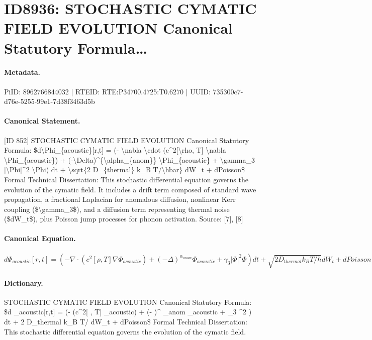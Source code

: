 \section*{ID8936: STOCHASTIC CYMATIC FIELD EVOLUTION Canonical Statutory Formula…}
\paragraph{Metadata.}
PiID: 8962766844032 | RTEID: RTE:P34700.4725:T0.6270 | UUID: 735300c7-d76e-5255-99e1-7d38f3463d5b

\paragraph{Canonical Statement.}
[ID 852] STOCHASTIC CYMATIC FIELD EVOLUTION Canonical Statutory Formula: \$d\textbackslash{}Phi\_\{acoustic\}[r,t] = (- \textbackslash{}nabla \textbackslash{}cdot (c\textasciicircum{}2[\textbackslash{}rho, T] \textbackslash{}nabla \textbackslash{}Phi\_\{acoustic\}) + (-\textbackslash{}Delta)\textasciicircum{}\{\textbackslash{}alpha\_\{anom\}\} \textbackslash{}Phi\_\{acoustic\} + \textbackslash{}gamma\_3 |\textbackslash{}Phi|\textasciicircum{}2 \textbackslash{}Phi) dt + \textbackslash{}sqrt\{2 D\_\{thermal\} k\_B T/\textbackslash{}hbar\} dW\_t + dPoisson\$ Formal Technical Dissertation: This stochastic differential equation governs the evolution of the cymatic field. It includes a drift term composed of standard wave propagation, a fractional Laplacian for anomalous diffusion, nonlinear Kerr coupling (\$\textbackslash{}gamma\_3\$), and a diffusion term representing thermal noise (\$dW\_t\$), plus Poisson jump processes for phonon activation. Source: [7], [8]

\paragraph{Canonical Equation.}
\[
d\Phi_{acoustic}[r,t] = (- \nabla \cdot (c^2[\rho, T] \nabla \Phi_{acoustic}) + (-\Delta)^{\alpha_{anom}} \Phi_{acoustic} + \gamma_3 |\Phi|^2 \Phi) dt + \sqrt{2 D_{thermal} k_B T/\hbar} dW_t + dPoisson
\]

\paragraph{Dictionary.}
STOCHASTIC CYMATIC FIELD EVOLUTION Canonical Statutory Formula: \$d \_acoustic[r,t] = (- (c\textasciicircum{}2[ , T] \_acoustic) + (- )\textasciicircum{} \_anom \_acoustic + \_3 \textasciicircum{}2 ) dt + 2 D\_thermal k\_B T/ dW\_t + dPoisson\$ Formal Technical Dissertation: This stochastic differential equation governs the evolution of the cymatic field.

